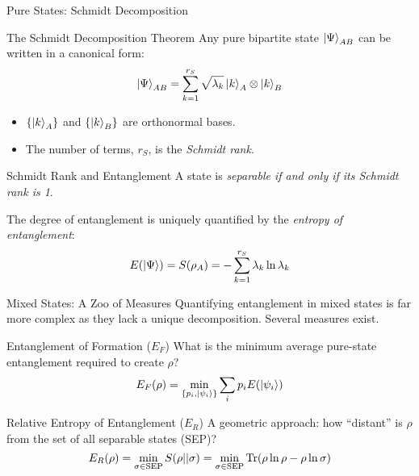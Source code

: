 \begin{frame}{Pure States: Schmidt Decomposition}
  \begin{block}{The Schmidt Decomposition Theorem}
    Any pure bipartite state $\ket{\Psi}_{AB}$ can be written in a canonical form:
    \begin{equation}
      \ket{\Psi}_{AB} = \sum_{k=1}^{r_S} \sqrt{\lambda_k} \ket{k}_A \otimes \ket{k}_B
    \end{equation}
    \begin{itemize}
      \item $\{\ket{k}_A\}$ and $\{\ket{k}_B\}$ are orthonormal bases.
      \item The number of terms, $r_S$, is the \emph{Schmidt rank}.
    \end{itemize}
  \end{block}
\end{frame}

\begin{frame}
  \begin{alertblock}{Schmidt Rank and Entanglement}
    A state is \emph{separable if and only if its Schmidt rank is 1}.

    The degree of entanglement is uniquely quantified by the \emph{entropy of entanglement}:
    \begin{equation}
      E(\ket{\Psi}) = S(\rho_A) = -\sum_{k=1}^{r_S} \lambda_k \ln \lambda_k
    \end{equation}
  \end{alertblock}
\end{frame}


\begin{frame}{Mixed States: A Zoo of Measures}
  Quantifying entanglement in mixed states is far more complex as they lack a
  unique decomposition. Several measures exist.
  \pause
  \begin{block}{Entanglement of Formation (\texorpdfstring{$E_F$}{E\_F})}
    What is the minimum average pure-state entanglement required to create $\rho$?
    \[ E_F(\rho) = \min_{\{p_i, \ket{\psi_i}\}} \sum_i p_i E(\ket{\psi_i}) \]
  \end{block}
  \pause
  \begin{block}{Relative Entropy of Entanglement (\texorpdfstring{$E_R$}{E\_R})}
    A geometric approach: how ``distant'' is $\rho$ from the set of all separable
    states (SEP)?
    \[ E_R(\rho) = \min_{\sigma \in \text{SEP}} S(\rho || \sigma) = \min_{\sigma
    \in \text{SEP}} \mathrm{Tr}(\rho \ln \rho - \rho \ln \sigma) \]
  \end{block}
\end{frame}

